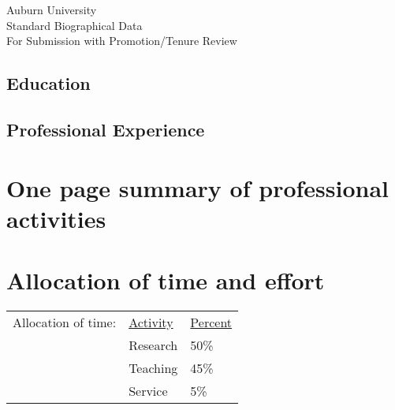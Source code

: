 


\newcommand{\longcontent}[1]{}

\newcommand{\oldcontent}[1]{}

\newcommand{\docTitle}{Biographical Data\xspace}


\singlespacing

\newpage


\bigskip
\begin{mytitle}
    Auburn University \\
    Standard Biographical Data \\
    For Submission with Promotion/Tenure Review
\end{mytitle}

\bigskip


\bigskip
\subsection*{Education}


\bigskip
\subsection*{Professional Experience}


\newpage

\section{One page summary of professional activities}



\newpage

\tableofcontents
\newpage

\section{Allocation of time and effort}
\begin{tabular}{ l l l }
    Allocation of time: & \underline{Activity} & \underline{Percent} \\
    & Research & 50\% \\
    & Teaching & 45\% \\
    & Service & 5\% \\
\end{tabular}



